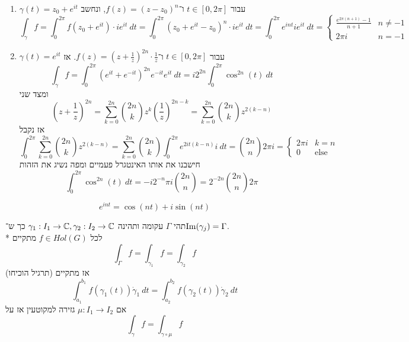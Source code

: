 \begin{example}
	\begin{enumerate}
		\item $\gamma(t) = z_0 + e^{it}$ עבור $t \in [0, 2\pi]$ ו־$f(z) = {(z - z_0)}^n$, ונחשב
			\[
				\int_\gamma f
				= \int_0^{2\pi} f(z_0 + e^{it}) \cdot i e^{it}\ dt
				= \int_0^{2\pi} {(z_0 + e^{it} - z_0)}^n \cdot i e^{it}\ dt
				= \int_0^{2\pi} e^{int} i e^{it}\ dt
				= \begin{cases}
					\frac{e^{2\pi(n + 1)} - 1}{n + 1} & n \ne -1 \\
					2\pi i & n = -1
				\end{cases}
			\]
		\item $\gamma(t) = e^{it}$ עבור $t \in [0, 2\pi]$ ו־$f(z) = {(z + \frac{1}{z})}^{2n} \cdot \frac{1}{z}$. אז
			\[
				\int_\gamma f = \int_0^{2\pi} {(e^{it} + e^{-it})}^{2n} e^{-it} e^{it}\ dt
				= i 2^{2n} \int_0^{2\pi} \cos^{2n}(t)\ dt
			\]
			ומצד שני
			\[
				{(z + \frac{1}{z})}^{2n}
				= \sum_{k = 0}^{2n} \binom{2n}{k} z^k {(\frac{1}{z})}^{2n - k}
				= \sum_{k = 0}^{2n} \binom{2n}{k} z^{2(k - n)}
			\]
			אז נקבל
			\[
				\int_0^{2\pi} \sum_{k = 0}^{2n} \binom{2n}{k} z^{2(k - n)}
				= \sum_{k = 0}^{2n} \binom{2n}{k} \int_0^{2\pi} e^{2it (k - n)} i\ dt
				= \binom{2n}{n} 2\pi i
				= \begin{cases}
					2\pi i & k = n \\
					0 & \text{else}
				\end{cases}
			\]
			חישבנו את אותו האינטגרל פעמיים ומפה נשיג את הזהות
			\[
				\int_0^{2\pi} \cos^{2n}(t)\ dt =-i2^{-n} \pi i \binom{2n}{n} = 2^{-2n} \binom{2n}{n} 2 \pi
			\]
	\end{enumerate}
\end{example}
\begin{exercise}
	\[
		e^{int} = \cos(nt) + i \sin(nt)
	\]
\end{exercise}
\begin{proposition}[ר־פרמטריזציה]
	תהי $\Gamma$ עקומה ותהינה $\gamma_1 : I_1 \to \mathbb{C}, \gamma_2 : I_2 \to \mathbb{C}$ כך ש־$\operatorname{Im}(\gamma_j) = \Gamma$. \\*
	לכל $f \in Hol(G)$ מתקיים
	\[
		\int_\Gamma f = \int_{\gamma_1} f = \int_{\gamma_2} f
	\]
	אז מתקיים (תרגיל הוכיחו)
	\[
		\int_{a_1}^{b_1} f(\gamma_1(t)) \dot{\gamma}_1\ dt = \int_{a_2}^{b_2} f(\gamma_2(t)) \dot{\gamma}_2\ dt
	\]
	אם $\mu : I_1 \to I_2$ גזירה למקוטעין אז על
	\[
		\int_\gamma f = \int_{\gamma \circ \mu} f
	\]
\end{proposition}


